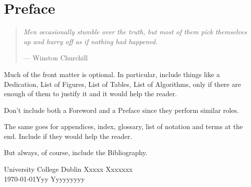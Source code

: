 %
%
%
%

\chapter*{Preface}


\begin{quote}
\noindent\textit{Men occasionally stumble over the truth, but most of them pick themselves up and
hurry off as if nothing had happened.}

\hspace{2cm}--- Winston Churchill
\end{quote}

Much of the front matter is optional. In particular, include things like a Dedication, List of Figures, List of Tables, List of Algorithms, only if there are enough of them to justify it and it would help the reader.

Don't include both a Foreword and a Preface since they perform similar roles.

The same goes for appendices, index, glossary, list of notation and terms at the end. Include if they would help the reader.

But always, of course, include the Bibliography.

\vspace{2em}

University College Dublin \hfill Xxxxx Xxxxxxx \\
\today \hfill Yyy Yyyyyyyyy
